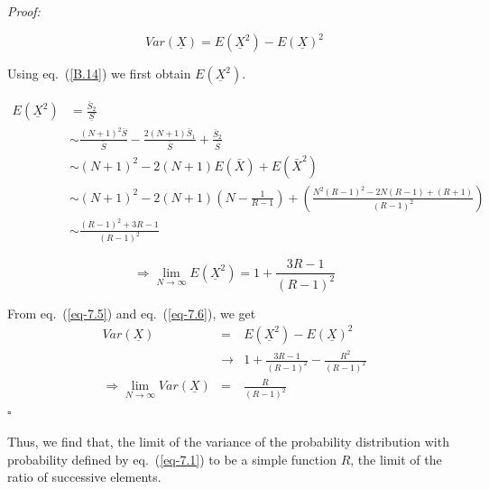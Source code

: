 \begin{multicols}{2}
\vspace{-.6cm}

{\it Proof:}

\begin{equation}
Var(\underline{X}) = E(\underline{X}^2) - E(\underline{X})^2\label{eq-7.4}
\end{equation}

Using eq.~(\ref{B.14}) we first obtain $E(\underline{X}^2)$.

\vspace{-.5cm}

{\fontsize{6}{7}\selectfont
\begin{align}
E(\underline{X}^2) &= \frac{\bar{S}_2}{\underline{S}} \nonumber\\
&\sim \frac{(N+1)^2\bar{S}}{\bar{S}} - \frac{2(N+1)\bar{S}_1}{\bar{S}} + \frac{\bar{S}_2}{\bar{S}}\nonumber\\
&\sim (N+1)^2 - 2(N+1)E(\bar{X}) +E(\bar{X}^2)\nonumber\\
&\sim (N+1)^2 - 2(N+1)\left(N-\frac{1}{R-1}\right) + \left(\frac{N^2(R-1)^2 - 2N(R-1)+(R+1)}{(R-1)^2}\right)\nonumber\\
&\sim \frac{(R-1)^2 +3R -1}{(R-1)^2}\nonumber
\end{align}}

\vspace{-1cm}

\begin{equation}
\Rightarrow \lim_{N \rightarrow \infty}E(\underline{X}^2) = 1 + \displaystyle{\frac{3R-1}{(R-1)^2}}\label{eq-7.5}
\end{equation} 

From eq.~(\ref{eq-7.5}) and eq.~(\ref{eq-7.6}), we get 
\begin{align}
Var(\underline{X}) &=& E(\underline{X}^2) - E(\underline{X})^2\nonumber\\
&\rightarrow& 1 + \frac{3R-1}{(R-1)^2} - \frac{R^2}{(R-1)^2}\nonumber\\ 
\Rightarrow \lim_{N \rightarrow \infty}Var(\underline{X}) &=& \frac{R}{(R-1)^2}\label{eq-7.6}
\end{align}
\hfill{$\square$}\\

\vspace{-.8cm}

Thus, we find that, the limit of the variance of the probability distribution with probability defined by eq.~(\ref{eq-7.1}) to be a simple function $R$, the limit of the ratio of successive elements.

\vspace{-.2cm}


\end{multicols}
